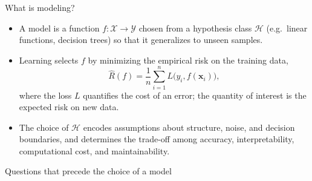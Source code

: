 
\begin{frame}{What is modeling?}
\begin{itemize}
\item A model is a function $f: \mathcal{X} \to \mathcal{Y}$ chosen from a hypothesis class $\mathcal{H}$ (e.g.\ linear functions, decision trees) so that it generalizes to unseen samples.
\item Learning selects $f$ by minimizing the empirical risk on the training data,
\[
\hat{R}(f) = \frac{1}{n}\sum_{i=1}^{n} L\big(y_i, f(\mathbf{x}_i)\big),
\]
where the loss $L$ quantifies the cost of an error; the quantity of interest is the expected risk on new data.
\item The choice of $\mathcal{H}$ encodes assumptions about structure, noise, and decision boundaries, and determines the trade-off among accuracy, interpretability, computational cost, and maintainability.
\end{itemize}
\coursefooter
\end{frame}

\begin{frame}{Questions that precede the choice of a model}
\centering
{}
\coursefooter
\end{frame}

